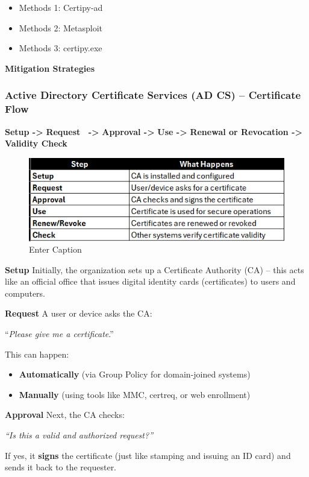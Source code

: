 \begin{itemize}
    \item Methods 1: Certipy-ad
    \item Methods 2: Metasploit
    \item Methods 3: certipy.exe
\end{itemize}
\textbf{Mitigation Strategies}

\subsubsection{Active Directory Certificate Services (AD CS) – Certificate Flow}

\textbf{Setup ->}\textbf{ Request  ->}\textbf{ Approval ->}\textbf{ Use ->}\textbf{ Renewal or Revocation ->}\textbf{ Validity Check}


\begin{figure}
    \centering
    \includegraphics[width=0.75\linewidth]{cssetup.png}
    \caption{Enter Caption}
    \label{fig:placeholder}
\end{figure}
\textbf{Setup}
Initially, the organization sets up a Certificate Authority (CA) – this acts like an official office that issues digital identity cards (certificates) to users and computers.

\textbf{Request}
A user or device asks the CA:

“\textit{Please give me a certificate}.”

This can happen:

\begin{itemize}
    \item \textbf{Automatically} (via Group Policy for domain-joined systems)
    \item \textbf{Manually} (using tools like MMC, certreq, or web enrollment)
\end{itemize}

\textbf{Approval}
Next, the CA checks:

\textit{“Is this a valid and authorized request?”}

If yes, it \textbf{signs} the certificate (just like stamping and issuing an ID card) and sends it back to the requester.

